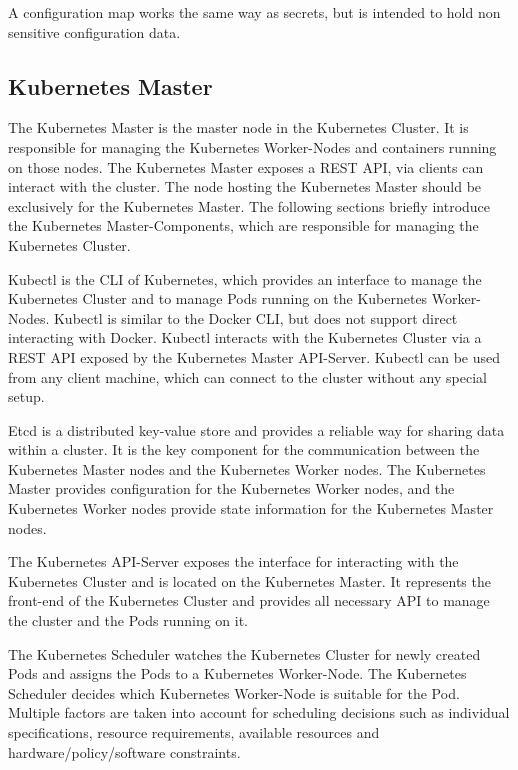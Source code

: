 A configuration map works the same way as secrets, but is intended to hold non sensitive configuration data\cite{CNCFKubernetesConfigMap2018}.

\subsection{Kubernetes Master}
\label{sec:caas-kubernetes-master}
The Kubernetes Master is the master node in the Kubernetes Cluster. It is responsible for managing the Kubernetes Worker-Nodes and containers running on those nodes. The Kubernetes Master exposes a REST API, via clients can interact with the cluster. The node hosting the Kubernetes Master should be exclusively for the Kubernetes Master. The following sections briefly introduce the Kubernetes Master-Components, which are responsible for managing the Kubernetes Cluster\cite{CNCFKubernetesComponents2018}.

Kubectl is the CLI of Kubernetes, which provides an interface to manage the Kubernetes Cluster and to manage Pods running on the Kubernetes Worker-Nodes. Kubectl is similar to the Docker CLI, but does not support direct interacting with Docker. Kubectl interacts with the Kubernetes Cluster via a REST API exposed by the Kubernetes Master API-Server. Kubectl can be used from any client machine, which can connect to the cluster without any special setup.

Etcd is a distributed key-value store and provides a reliable way for sharing data within a cluster. It is the key component for the communication between the Kubernetes Master nodes and the Kubernetes Worker nodes. The Kubernetes Master provides configuration for the Kubernetes Worker nodes, and the Kubernetes Worker nodes provide state information for the Kubernetes Master nodes\cite{CoreOSETCD2018}.

The Kubernetes API-Server exposes the interface for interacting with the Kubernetes Cluster and is located on the Kubernetes Master. It represents the front-end of the Kubernetes Cluster and provides all necessary API to manage the cluster and the Pods running on it.

The Kubernetes Scheduler watches the Kubernetes Cluster for newly created Pods and assigns the Pods to a Kubernetes Worker-Node. The Kubernetes Scheduler decides which Kubernetes Worker-Node is suitable for the Pod. Multiple factors are taken into account for scheduling decisions such as individual specifications, resource requirements, available resources and hardware/policy/software constraints.

